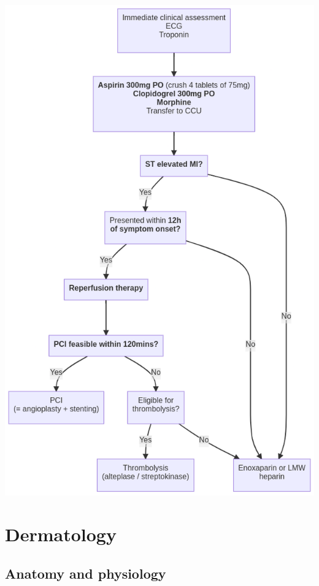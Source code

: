 \documentclass[
  12pt,
]{memoir}
\begin{document}
\includegraphics[width=.7\textwidth]{../assets/MI-mx.png}

\pagebreak

\hypertarget{dermatology}{%
\chapter{Dermatology}\label{dermatology}}

\hypertarget{anatomy-and-physiology}{%
\section{Anatomy and physiology}\label{anatomy-and-physiology}}
\end{document}
